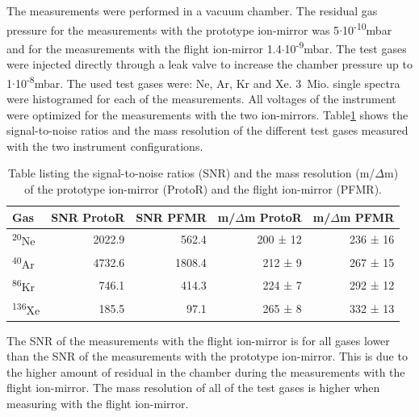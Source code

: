 	The measurements were performed in a vacuum chamber. The residual gas pressure for the measurements with the prototype ion-mirror was 5$\cdot$10\textsuperscript{-10}mbar and for the measurements with the flight ion-mirror 1.4$\cdot$10\textsuperscript{-9}mbar. The test gases were injected directly through a leak valve to increase the chamber pressure up to 1$\cdot$10\textsuperscript{-8}mbar. The used test gases were: Ne, Ar, Kr and Xe. 3\, Mio. single spectra were histogramed for each of the measurements. All voltages of the instrument were optimized for the measurements with the two ion-mirrors. Table\ref{tab:refPerftab} shows the signal-to-noise ratios and the mass resolution of the different test gases measured with the two instrument configurations.\\
	\begin{table}
		\begin{center}
		\begin{tabular}{|l|r|r|r|r|}
			\hline
			Gas						&SNR ProtoR	&SNR PFMR	&m/$\Delta$m ProtoR	&m/$\Delta$m PFMR\\
			\hline
			\textsuperscript{20}Ne	&2022.9		&562.4		&200 ± 12		&236 ± 16\\
			\textsuperscript{40}Ar	&4732.6		&1808.4		&212 ±  9		&267 ± 15\\
			\textsuperscript{86}Kr	&746.1		&414.3		&224 ±  7		&292 ± 12\\
			\textsuperscript{136}Xe	&185.5		&97.1		&265 ±  8		&332 ± 13\\
			\hline
		\end{tabular}
		\end{center}
		\caption{Table listing the signal-to-noise ratios (SNR) and the mass resolution (m/$\Delta$m) of the prototype ion-mirror (ProtoR) and the flight ion-mirror (PFMR).}
		\label{tab:refPerftab}
	\end{table}
	The SNR of the measurements with the flight ion-mirror is for all gases lower than the SNR of the measurements with the prototype ion-mirror. This is due to the higher amount of residual in the chamber during the measurements with the flight ion-mirror. The mass resolution of all of the test gases is higher when measuring with the flight ion-mirror.

	
